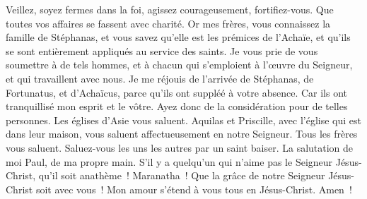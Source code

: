 \begin{multicols}{2}
Veillez, soyez fermes dans la foi, agissez courageusement, fortifiez-vous.
Que toutes vos affaires se fassent avec charité.
Or mes frères, vous connaissez la famille de Stéphanas, et vous savez qu'elle est les prémices de l'Achaïe, et qu'ils se sont entièrement appliqués au service des saints.
Je vous prie de vous soumettre à de tels hommes, et à chacun qui s'emploient à l'œuvre du Seigneur, et qui travaillent avec nous.
Je me réjouis de l'arrivée de Stéphanas, de Fortunatus, et d'Achaïcus, parce qu'ils ont suppléé à votre absence.
Car ils ont tranquillisé mon esprit et le vôtre. Ayez donc de la considération pour de telles personnes.
Les églises d'Asie vous saluent. Aquilas et Priscille, avec l'église qui est dans leur maison, vous saluent affectueusement en notre Seigneur.
Tous les frères vous saluent. Saluez-vous les uns les autres par un saint baiser.
La salutation de moi Paul, de ma propre main.
S'il y a quelqu'un qui n'aime pas le Seigneur Jésus-Christ, qu'il soit anathème~! Maranatha~!
Que la grâce de notre Seigneur Jésus-Christ soit avec vous~!
Mon amour s'étend à vous tous en Jésus-Christ. Amen~!
\PPE{}
\end{multicols}
